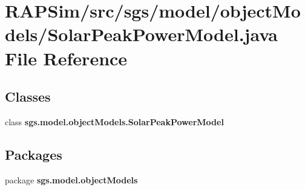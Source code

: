 \section{R\-A\-P\-Sim/src/sgs/model/object\-Models/\-Solar\-Peak\-Power\-Model.java File Reference}
\label{_solar_peak_power_model_8java}
\subsection*{Classes}
\begin{DoxyCompactItemize}
\item 
class {\bf sgs.\-model.\-object\-Models.\-Solar\-Peak\-Power\-Model}
\end{DoxyCompactItemize}
\subsection*{Packages}
\begin{DoxyCompactItemize}
\item 
package {\bf sgs.\-model.\-object\-Models}
\end{DoxyCompactItemize}
